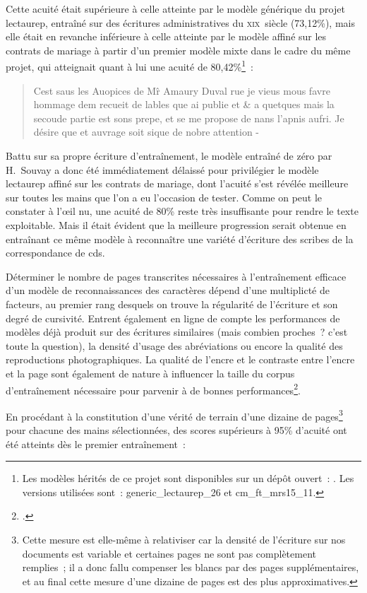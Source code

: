 \documentclass[a4paper,12pt,twoside]{book}
\newcommand{\siecle}[1]{\textsc{#1}\ieme}
\begin{document}
				Cette acuité était supérieure à celle atteinte par le modèle générique du projet \gls{lectaurep}, entraîné sur des écritures administratives du \siecle{xix}~siècle (73,12\%), mais elle était en revanche inférieure à celle atteinte par le modèle affiné sur les contrats de mariage à partir d'un premier modèle mixte dans le cadre du même projet, qui atteignait quant à lui une acuité de 80,42\%\footnote{Les modèles hérités de ce projet sont disponibles sur un dépôt ouvert~: \cite{KrakenModelsTranscription}. Les versions utilisées sont~: \textsf{generic\_lectaurep\_26} et \textsf{cm\_ft\_mrs15\_11}.}~:
				
				\begin{quote}
					\textsf{Cest saus les Auopices de M\^r Amaury Duval rue je vieus mous favre
					hommage dem recueit de lables que ai publie et \& a quetques mais
					la secoude partie est sons prepe, et se me propose de nans l'apnis
					aufri. Je désire que et auvrage soit sique de nobre attention -}
				\end{quote}
				
				Battu sur sa propre écriture d'entraînement, le modèle entraîné de zéro par H.~Souvay a donc été immédiatement délaissé pour privilégier le modèle \gls{lectaurep} affiné sur les contrats de mariage, dont l'acuité s'est révélée meilleure sur toutes les mains que l'on a eu l'occasion de tester. Comme on peut le constater à l'œil nu, une acuité de 80\% reste très insuffisante pour rendre le texte exploitable. Mais il était évident que la meilleure progression serait obtenue en entraînant ce même modèle à reconnaître une variété d'écriture des scribes de la correspondance de \gls{cds}.
				
				Déterminer le nombre de pages transcrites nécessaires à l'entraînement efficace d'un modèle de reconnaissances des caractères dépend d'une multiplicté de facteurs, au premier rang desquels on trouve la régularité de l'écriture et son degré de cursivité. Entrent également en ligne de compte les performances de modèles déjà produit sur des écritures similaires (mais combien proches~? c'est toute la question), la densité d'usage des abréviations ou encore la qualité des reproductions photographiques. La qualité de l'encre et le contraste entre l'encre et la page sont également de nature à influencer la taille du corpus d'entraînement nécessaire pour parvenir à de bonnes performances\footcite{stokesEScriptoriumVREManuscript2021}.
				
				En procédant à la constitution d'une vérité de terrain d'une dizaine de pages\footnote{Cette mesure est elle-même à relativiser car la densité de l'écriture sur nos documents est variable et certaines pages ne sont pas complètement remplies~; il a donc fallu compenser les blancs par des pages supplémentaires, et au final cette mesure d'une dizaine de pages est des plus approximatives.} pour chacune des mains sélectionnées, des scores supérieurs à 95\% d'acuité ont été atteints dès le premier entraînement~:
				
\end{document}

